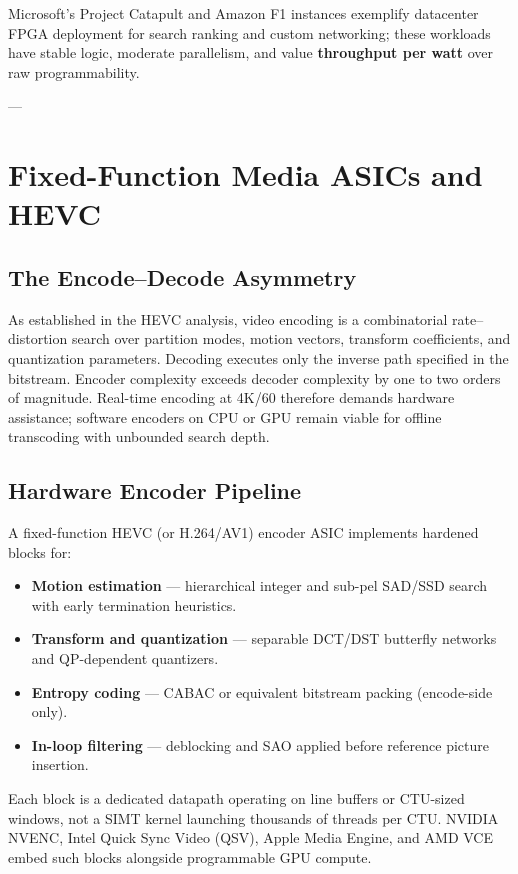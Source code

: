 \documentclass[11pt,journal,onecolumn]{IEEEtran}
\begin{document}
Microsoft's Project Catapult and Amazon F1 instances exemplify datacenter FPGA deployment for search ranking and custom networking; these workloads have stable logic, moderate parallelism, and value \textbf{throughput per watt} over raw programmability.

---

\section{Fixed-Function Media ASICs and HEVC}

\subsection{The Encode--Decode Asymmetry}
As established in the HEVC analysis, video encoding is a combinatorial rate--distortion search over partition modes, motion vectors, transform coefficients, and quantization parameters. Decoding executes only the inverse path specified in the bitstream. Encoder complexity exceeds decoder complexity by one to two orders of magnitude. Real-time encoding at 4K/60 therefore demands hardware assistance; software encoders on CPU or GPU remain viable for offline transcoding with unbounded search depth.

\subsection{Hardware Encoder Pipeline}
A fixed-function HEVC (or H.264/AV1) encoder ASIC implements hardened blocks for:
\begin{itemize}
    \item \textbf{Motion estimation} --- hierarchical integer and sub-pel SAD/SSD search with early termination heuristics.
    \item \textbf{Transform and quantization} --- separable DCT/DST butterfly networks and QP-dependent quantizers.
    \item \textbf{Entropy coding} --- CABAC or equivalent bitstream packing (encode-side only).
    \item \textbf{In-loop filtering} --- deblocking and SAO applied before reference picture insertion.
\end{itemize}
Each block is a dedicated datapath operating on line buffers or CTU-sized windows, not a SIMT kernel launching thousands of threads per CTU. NVIDIA NVENC, Intel Quick Sync Video (QSV), Apple Media Engine, and AMD VCE embed such blocks alongside programmable GPU compute.
\end{document}
